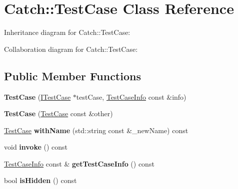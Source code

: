 \hypertarget{classCatch_1_1TestCase}{}\section{Catch\+:\+:Test\+Case Class Reference}
\label{classCatch_1_1TestCase}


Inheritance diagram for Catch\+:\+:Test\+Case\+:


Collaboration diagram for Catch\+:\+:Test\+Case\+:
\subsection*{Public Member Functions}
\begin{DoxyCompactItemize}
\item 
{\bfseries Test\+Case} (\hyperlink{structCatch_1_1ITestCase}{I\+Test\+Case} $\ast$test\+Case, \hyperlink{structCatch_1_1TestCaseInfo}{Test\+Case\+Info} const \&info)\hypertarget{classCatch_1_1TestCase_a03a5b913484681bd6d398dc5e9c2a907}{}\label{classCatch_1_1TestCase_a03a5b913484681bd6d398dc5e9c2a907}

\item 
{\bfseries Test\+Case} (\hyperlink{classCatch_1_1TestCase}{Test\+Case} const \&other)\hypertarget{classCatch_1_1TestCase_ac0011d3789edc3e44edb41f13c4775a0}{}\label{classCatch_1_1TestCase_ac0011d3789edc3e44edb41f13c4775a0}

\item 
\hyperlink{classCatch_1_1TestCase}{Test\+Case} {\bfseries with\+Name} (std\+::string const \&\+\_\+new\+Name) const \hypertarget{classCatch_1_1TestCase_ab6dbc6c82b7c1680013c67bdedccfc8e}{}\label{classCatch_1_1TestCase_ab6dbc6c82b7c1680013c67bdedccfc8e}

\item 
void {\bfseries invoke} () const \hypertarget{classCatch_1_1TestCase_aac2e028135cc88c3e3aac04650960a6c}{}\label{classCatch_1_1TestCase_aac2e028135cc88c3e3aac04650960a6c}

\item 
\hyperlink{structCatch_1_1TestCaseInfo}{Test\+Case\+Info} const \& {\bfseries get\+Test\+Case\+Info} () const \hypertarget{classCatch_1_1TestCase_a25c03661ab092431cdff10df5c58a5a7}{}\label{classCatch_1_1TestCase_a25c03661ab092431cdff10df5c58a5a7}

\item 
bool {\bfseries is\+Hidden} () const \hypertarget{classCatch_1_1TestCase_a61477cce84066cb77d4eeef5a1470a36}{}\label{classCatch_1_1TestCase_a61477cce84066cb77d4eeef5a1470a36}


\end{DoxyCompactItemize}
